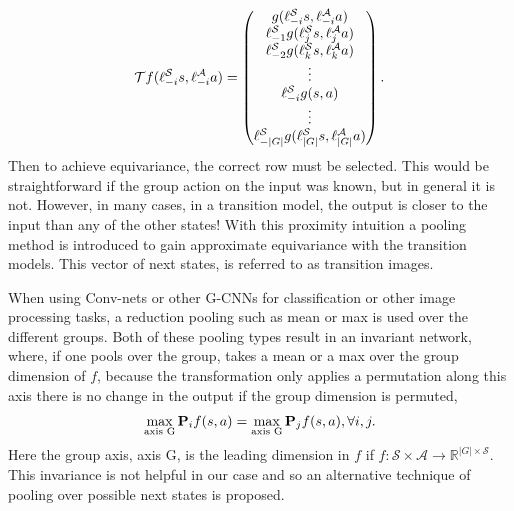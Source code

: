 \begin{equation}\label{eq:g-cnn}
	\mathbf{\mathcal{T}}f(\ell_{-i}^\mathcal{S}s,\ell_{-i}^\mathcal{A}a) = \begin{pmatrix}
		g(\ell_{-i}^\mathcal{S}s,\ell_{-i}^\mathcal{A}a)                 \\
		\ell_{-1}^\mathcal{S}g(\ell_j^\mathcal{S}s,\ell^\mathcal{A}_ja)  \\
		\ell_{-2}^\mathcal{S}g(\ell^\mathcal{S}_ks, \ell^\mathcal{A}_ka) \\
		\vdots                                                           \\
		\ell_{-i}^\mathcal{S}g(s, a)                                     \\
		\vdots                                                           \\
		\ell_{-|G|}^\mathcal{S}g(\ell_{|G|}^\mathcal{S}s, \ell^\mathcal{A}_{|G|}a)
	\end{pmatrix}.
\end{equation}
Then to achieve equivariance, the correct row must be selected. This would be straightforward if the group action on the input was known, but in general it is not. However, in many cases, in a transition model, the output is closer to the input than any of the other states! With this proximity intuition a pooling method is introduced to gain approximate equivariance with the transition models. This vector of next states, is referred to as transition images.

When using Conv-nets or other G-CNNs for classification or other image processing tasks, a reduction pooling such as mean or max is used over the different groups. Both of these pooling types result in an invariant network, where, if one pools over the group, takes a mean or a max over the group dimension of $f$, because the transformation only applies a permutation along this axis there is no change in the output if the group dimension is permuted,
\begin{equation}
	\max_\text{axis G} \mathbf{P}_i f(s, a) = \max_\text{axis G} \mathbf{P}_j f(s, a), \forall i, j.
\end{equation}
Here the group axis, axis G, is the leading dimension in $f$ if $f: \mathcal{S} \times \mathcal{A} \rightarrow \mathbb{R}^{|G| \times \mathcal{S}}$. This invariance is not helpful in our case and so an alternative technique of pooling over possible next states is proposed.


